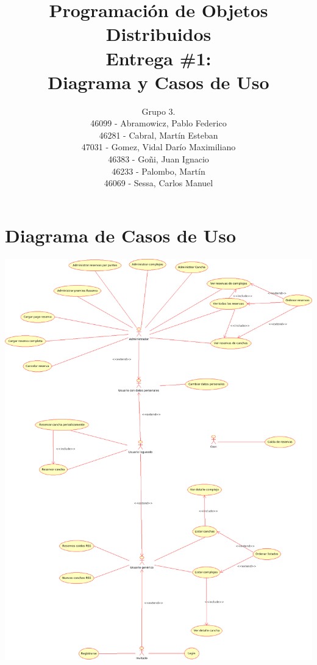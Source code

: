 \documentclass[a4paper,11pt]{article}
\title{
        Programación de Objetos Distribuidos \\
        Entrega \#1: \\
        Diagrama y Casos de Uso
    }
\author{
        Grupo 3. \\
        46099 - Abramowicz, Pablo Federico \\
        46281 - Cabral, Martín Esteban \\
        47031 - Gomez, Vidal Darío Maximiliano \\
        46383 - Goñi, Juan Ignacio \\
        46233 - Palombo, Martín \\
        46069 - Sessa, Carlos Manuel
        }
\date{}
\begin{document}
\maketitle
\pagebreak

\renewcommand{\theenumi}{\arabic{enumi}.}
\renewcommand{\labelenumi}{\theenumi}

\renewcommand{\theenumii}{\arabic{enumii}.}
\renewcommand{\labelenumii}{\theenumii}

\renewcommand{\theenumiii}{\arabic{enumiii}.}
\renewcommand{\labelenumiii}{\theenumiii}


\section{Diagrama de Casos de Uso}

\begin{center}
 \includegraphics[width=1.00\textwidth]{use_cases.png}
\end{center}
\end{document}

